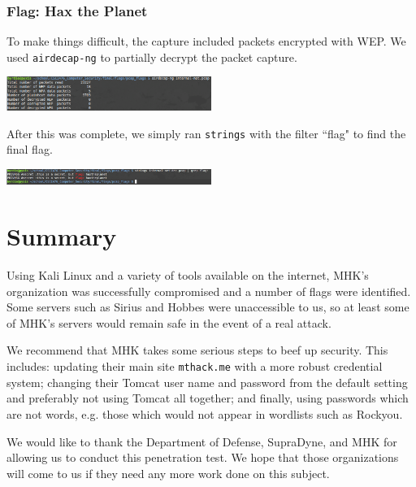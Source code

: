 \documentclass[10pt,a4paper,titlepage]{article}
\begin{document}
\subsubsection{Flag: Hax the Planet}
To make things difficult, the capture included packets encrypted with WEP. We used \texttt{airdecap-ng} to partially decrypt the packet capture.
\begin{center}
\includegraphics[width=0.5\textwidth]{pcap_flags/haxtheplanet/decap}
\end{center}
After this was complete, we simply ran \texttt{strings} with the filter ``flag" to find the final flag.
\begin{center}
\includegraphics[width=0.5\textwidth]{pcap_flags/haxtheplanet/flag}
\end{center}
\section{Summary}
Using Kali Linux and a variety of tools available on the internet, MHK's organization was successfully compromised and a number of flags were identified. Some servers such as Sirius and Hobbes were unaccessible to us, so at least some of MHK's servers would remain safe in the event of a real attack.

We recommend that MHK takes some serious steps to beef up security. This includes: updating their main site \texttt{mthack.me} with a more robust credential system; changing their Tomcat user name and password from the default setting and preferably not using Tomcat all together; and finally, using passwords which are not words, e.g. those which would not appear in wordlists such as Rockyou.

We would like to thank the Department of Defense, SupraDyne, and MHK for allowing us to conduct this penetration test. We hope that those organizations will come to us if they need any more work done on this subject.


\end{document}
